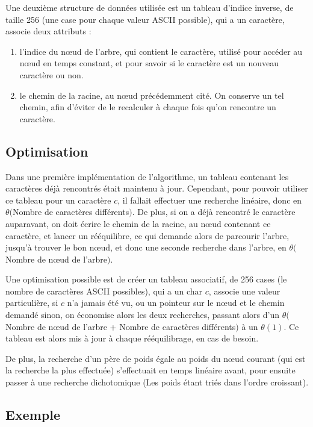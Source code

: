\documentclass{article}
\begin{document}
Une deuxi\`eme structure de donn\'ees utilis\'ee est un tableau d'indice inverse, de taille 256 (une case pour chaque valeur ASCII possible), qui a un caract\`ere, associe deux attributs :
\begin{enumerate}
\item l'indice du n{\oe}ud de l'arbre, qui contient le caract\`ere, utilis\'e pour acc\'eder au n{\oe}ud en temps constant, et pour savoir si le caract\`ere est un nouveau caract\`ere ou non. 
\item le chemin de la racine, au n{\oe}ud pr\'ec\'edemment cit\'e.
On conserve un tel chemin, afin d'\'eviter de le recalculer \`a chaque fois qu'on rencontre un caract\`ere.
\end{enumerate}

\subsection{Optimisation}

Dans une premi\`ere impl\'ementation de l'algorithme, un tableau contenant les caract\`eres d\'ej\`a rencontr\'es \'etait maintenu \`a jour. Cependant, pour pouvoir utiliser ce tableau pour un caract\`ere $c$, il fallait effectuer une recherche lin\'eaire, donc en $\theta($Nombre de caract\`eres diff\'erents$)$.
De plus, si on a d\'ej\`a rencontr\'e le caract\`ere auparavant, on doit \'ecrire le chemin de la racine, au n{\oe}ud contenant ce caract\`ere, et lancer un r\'e\'equilibre, ce qui demande alors de parcourir l'arbre, jusqu'\`a trouver le bon n{\oe}ud, et donc une seconde recherche dans l'arbre, en $\theta($Nombre de n{\oe}ud de l'arbre$)$.

Une optimisation possible est de cr\'eer un tableau associatif, de 256 cases (le nombre de caract\`eres ASCII possibles), qui a un char $c$, associe une valeur particuli\`ere, si $c$ n'a jamais \'et\'e vu, ou un pointeur sur le n{\oe}ud et le chemin demand\'e sinon, on \'economise alors les deux recherches, passant alors d'un $\theta($Nombre de n{\oe}ud de l'arbre + Nombre de caract\`eres diff\'erents$)$ \`a un $\theta(1)$. Ce tableau est alors mis \`a jour \`a chaque r\'e\'equilibrage, en cas de besoin.

De plus, la recherche d'un p\`ere de poids \'egale au poids du n{\oe}ud courant (qui est la recherche la plus effectu\'ee) s'effectuait en temps lin\'eaire avant, pour ensuite passer \`a une recherche dichotomique (Les poids \'etant tri\'es dans l'ordre croissant).
\newpage
\subsection{Exemple}
\end{document}
